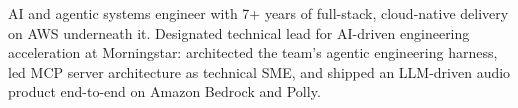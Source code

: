 ﻿

\begin{cvparagraph}
AI and agentic systems engineer with 7+ years of full-stack, cloud-native delivery on AWS underneath it. Designated technical lead for AI-driven engineering acceleration at Morningstar: architected the team's agentic engineering harness, led MCP server architecture as technical SME, and shipped an LLM-driven audio product end-to-end on Amazon Bedrock and Polly.
\end{cvparagraph}
